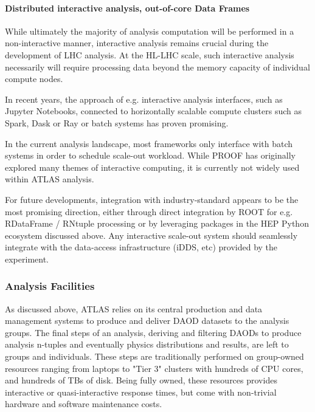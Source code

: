 \paragraph{Distributed interactive analysis, out-of-core Data Frames}

While ultimately the majority of analysis computation will be performed in a non-interactive manner, interactive analysis remains crucial during the development of LHC analysis. At the HL-LHC scale, such interactive analysis necessarily will require processing data beyond the memory capacity of individual compute nodes. 

In recent years, the approach of e.g. interactive analysis interfaces, such as Jupyter Notebooks, connected to horizontally scalable compute clusters such as Spark, Dask or Ray or batch systems has proven promising.

In the current analysis landscape, most frameworks only interface with batch systems in order to schedule scale-out workload. While PROOF has originally explored many themes of interactive computing, it is currently not widely used within ATLAS analysis.

For future developments, integration with industry-standard appears to be the most promising direction, either through direct integration by ROOT for e.g. RDataFrame / RNtuple processing or by leveraging packages in the HEP Python ecosystem discussed above. Any interactive scale-out system should seamlessly integrate with the data-access infrastructure (iDDS, etc) provided by the experiment.

\subsubsection{Analysis Facilities}
As discussed above, ATLAS relies on its central production and data management systems to produce and deliver DAOD datasets to the analysis groups. The final steps of an analysis, deriving and filtering DAODs to produce analysis n-tuples and eventually physics distributions and results, are left to groups and individuals. These steps are traditionally performed on group-owned resources ranging from laptops to "Tier 3" clusters with hundreds of CPU cores, and hundreds of TBs of disk. Being fully owned, these resources provides interactive or quasi-interactive response times, but come with non-trivial hardware and software maintenance costs. 

